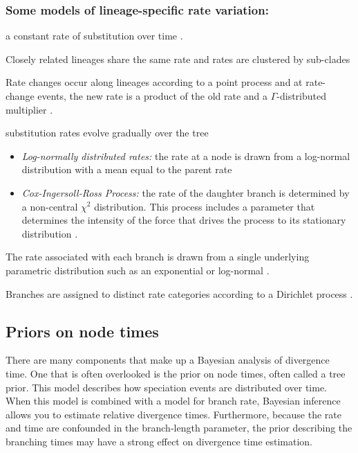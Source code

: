 \subsubsection{Some models of lineage-specific rate variation:}
\begin{description}[align=left]
\item [Global molecular clock:] a constant rate of substitution over time \citep{Zuckerkandl1962}.
\item [Local molecular clocks:] Closely related lineages share the same rate and rates are clustered by sub-clades \citep{Kishino1990,Rambaut1998,Yang2003,Drummond2010} 
\item [Compound Poisson process:] Rate changes occur along lineages according to a point process and at rate-change events, the new rate is a product of the old rate and a $\Gamma$-distributed multiplier \citep{Huelsenbeck2000a}.
\item [Autocorrelated rates:] substitution rates evolve gradually over the tree
\begin{itemize}
\item \textit{Log-normally distributed rates:} the rate at a node is drawn from a log-normal distribution with
a mean equal to the parent rate \citep{Thorne1998,Kishino2001,Thorne2002}
\item \textit{Cox-Ingersoll-Ross Process:} the rate of the daughter branch is determined by a non-central $\chi^2$ distribution. 
This process includes a parameter that determines the intensity of the force that drives the process to its stationary distribution \citep{Lepage2006}.
\end{itemize}
\item [Uncorrelated rates:] The rate associated with each branch is drawn from a single underlying parametric distribution
such as an exponential or log-normal \citep{Drummond2006,Rannala2007,Lepage2007}.
\item [Mixture model on branch rates:] Branches are assigned to distinct rate categories according to a Dirichlet process \citep{Heath2012b}.
\end{description}



\subsection{Priors on node times}

There are many components that make up a Bayesian analysis of divergence time. 
One that is often overlooked is the prior on node times, often called a tree prior. 
This model describes how speciation events are distributed over time. 
When this model is combined with a model for branch rate, Bayesian inference allows you to estimate relative divergence times. 
Furthermore, because the rate and time are confounded in the branch-length parameter, the prior describing the branching times may have a strong effect on divergence time estimation.


